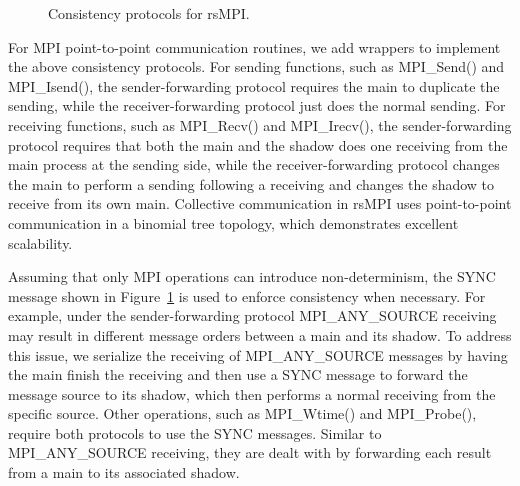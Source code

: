 \begin{figure}[!h]
  \begin{center}
  \end{center}
  \caption{Consistency protocols for rsMPI.}
  \label{fig:cons_protocol}
\end{figure}



For MPI point-to-point communication routines, we add wrappers to implement the above consistency protocols. For sending functions, such as MPI\_Send() and MPI\_Isend(), the sender-forwarding protocol requires the main to duplicate the sending, while the receiver-forwarding protocol just does the normal sending. For receiving functions, such as MPI\_Recv() and MPI\_Irecv(), the sender-forwarding protocol requires that both the main and the shadow does one receiving from the main process at the sending side, while the receiver-forwarding protocol changes the main to perform a sending following a receiving and changes the shadow to receive from its own main. 
Collective communication in rsMPI uses point-to-point communication in a binomial tree topology, which demonstrates excellent scalability.

Assuming that only MPI operations can introduce non-determinism, the SYNC message shown in Figure~\ref{fig:cons_protocol} is used to enforce consistency when necessary. For example, under the sender-forwarding protocol MPI\_ANY\_SOURCE receiving may result in different message orders between a main and its shadow. To address this issue, we serialize the receiving of MPI\_ANY\_SOURCE messages by having the main finish the receiving and then use a SYNC message to forward the message source to its shadow, which then performs a normal receiving from the specific source. Other operations, such as MPI\_Wtime() and MPI\_Probe(), require both protocols to use the SYNC messages. Similar to MPI\_ANY\_SOURCE receiving, they are dealt with by forwarding each result from a main to its associated shadow.

